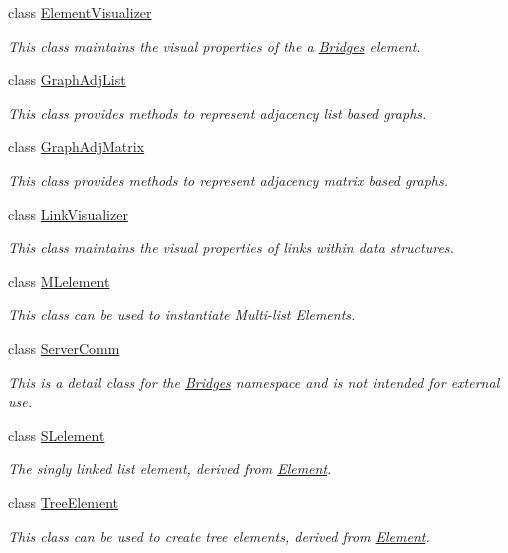 \begin{DoxyCompactItemize}
class \mbox{\hyperlink{classbridges_1_1_element_visualizer}{Element\+Visualizer}}
\begin{DoxyCompactList}\small\item\em This class maintains the visual properties of the a \mbox{\hyperlink{namespacebridges_1_1_bridges}{Bridges}} element. \end{DoxyCompactList}\item 
class \mbox{\hyperlink{classbridges_1_1_graph_adj_list}{Graph\+Adj\+List}}
\begin{DoxyCompactList}\small\item\em This class provides methods to represent adjacency list based graphs. \end{DoxyCompactList}\item 
class \mbox{\hyperlink{classbridges_1_1_graph_adj_matrix}{Graph\+Adj\+Matrix}}
\begin{DoxyCompactList}\small\item\em This class provides methods to represent adjacency matrix based graphs. \end{DoxyCompactList}\item 
class \mbox{\hyperlink{classbridges_1_1_link_visualizer}{Link\+Visualizer}}
\begin{DoxyCompactList}\small\item\em This class maintains the visual properties of links within data structures. \end{DoxyCompactList}\item 
class \mbox{\hyperlink{classbridges_1_1_m_lelement}{M\+Lelement}}
\begin{DoxyCompactList}\small\item\em This class can be used to instantiate Multi-\/list Elements. \end{DoxyCompactList}\item 
class \mbox{\hyperlink{classbridges_1_1_server_comm}{Server\+Comm}}
\begin{DoxyCompactList}\small\item\em This is a detail class for the \mbox{\hyperlink{namespacebridges_1_1_bridges}{Bridges}} namespace and is not intended for external use. \end{DoxyCompactList}\item 
class \mbox{\hyperlink{classbridges_1_1_s_lelement}{S\+Lelement}}
\begin{DoxyCompactList}\small\item\em The singly linked list element, derived from \mbox{\hyperlink{classbridges_1_1_element}{Element}}. \end{DoxyCompactList}\item 
class \mbox{\hyperlink{classbridges_1_1_tree_element}{Tree\+Element}}
\begin{DoxyCompactList}\small\item\em This class can be used to create tree elements, derived from \mbox{\hyperlink{classbridges_1_1_element}{Element}}. \end{DoxyCompactList}\end{DoxyCompactItemize}
